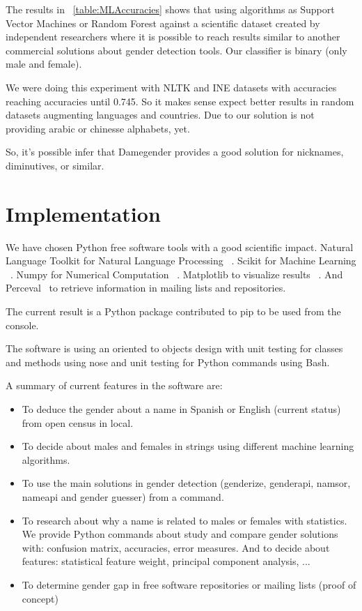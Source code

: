 \documentclass[a4paper]{article}
\begin{document}
The results in ~\ref{table:MLAccuracies} shows that using algorithms
as Support Vector Machines or Random Forest against a scientific
dataset created by independent researchers where it is possible to
reach results similar to another commercial solutions about gender
detection tools. Our classifier is binary (only male and female).

We were doing this experiment with NLTK and INE datasets with
accuracies reaching accuracies until 0.745. So it makes sense expect
better results in random datasets augmenting languages and
countries. Due to our solution is not providing arabic or chinesse
alphabets, yet.

So, it's possible infer that Damegender provides a good solution for
nicknames, diminutives, or similar.

\section{Implementation}

We have chosen Python free software tools with a good scientific
impact. Natural Language Toolkit for Natural Language Processing
~\cite{loper2002nltk}. Scikit for Machine Learning
~\cite{pedregosa2011scikit}. Numpy for Numerical Computation
~\cite{van2011numpy}. Matplotlib to visualize results
~\cite{hunter2007matplotlib}. And Perceval~\cite{duenas2018perceval}
to retrieve information in mailing lists and repositories.

The current result is a Python package contributed to pip to be used
from the console.

The software is using an oriented to objects design with unit testing
for classes and methods using nose and unit testing for Python
commands using Bash. 

A summary of current features in the software are:

\begin{itemize}
\item To deduce the gender about a name in Spanish or English (current
  status) from open census in local.
\item To decide about males and females in strings using different
  machine learning algorithms.
\item To use the main solutions in gender detection (genderize, genderapi,
namsor, nameapi and gender guesser) from a command.
\item To research about why a name is related to males or females with
  statistics. We provide Python commands about study and compare
  gender solutions with: confusion matrix, accuracies, error
  measures. And to decide about features: statistical feature weight,
  principal component analysis, ...
\item To determine gender gap in free software repositories or mailing
  lists (proof of concept)
\end{itemize}
\end{document}
